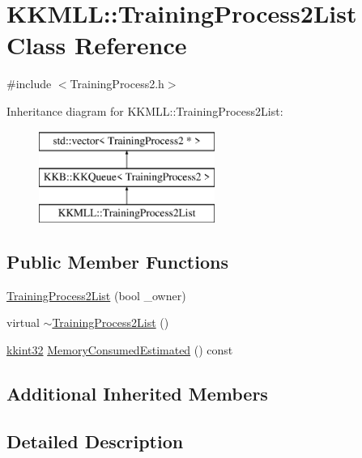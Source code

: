 \hypertarget{class_k_k_m_l_l_1_1_training_process2_list}{}\section{K\+K\+M\+LL\+:\+:Training\+Process2\+List Class Reference}
\label{class_k_k_m_l_l_1_1_training_process2_list}


{\ttfamily \#include $<$Training\+Process2.\+h$>$}

Inheritance diagram for K\+K\+M\+LL\+:\+:Training\+Process2\+List\+:\begin{figure}[H]
\begin{center}
\leavevmode
\includegraphics[height=3.000000cm]{class_k_k_m_l_l_1_1_training_process2_list}
\end{center}
\end{figure}
\subsection*{Public Member Functions}
\begin{DoxyCompactItemize}
\item 
\hyperlink{class_k_k_m_l_l_1_1_training_process2_list_aae6abe1621d0355071473bc4f13e7522}{Training\+Process2\+List} (bool \+\_\+owner)
\item 
virtual \hyperlink{class_k_k_m_l_l_1_1_training_process2_list_a80783125dd5ba0c93ec8fdf4b775d3d3}{$\sim$\+Training\+Process2\+List} ()
\item 
\hyperlink{namespace_k_k_b_a8fa4952cc84fda1de4bec1fbdd8d5b1b}{kkint32} \hyperlink{class_k_k_m_l_l_1_1_training_process2_list_aa921b859d4ddd9a6f3d649b8ba71780e}{Memory\+Consumed\+Estimated} () const 
\end{DoxyCompactItemize}
\subsection*{Additional Inherited Members}


\subsection{Detailed Description}


